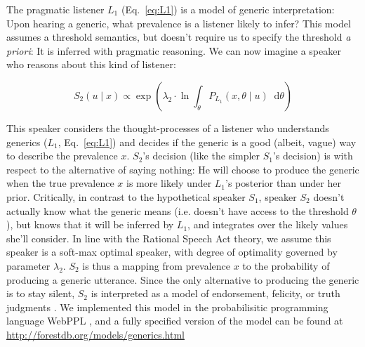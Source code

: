 \documentclass[12pt,letterpaper]{article}
\newcommand*\diff{\mathop{}\!\mathrm{d}}
\begin{document}
The pragmatic listener $L_1$ (Eq.~\ref{eq:L1}) is a model of generic interpretation: Upon hearing a generic, what prevalence is a listener likely to infer?
This model assumes a threshold semantics, but doesn't require us to specify the threshold \emph{a priori}: It is inferred with pragmatic reasoning.
We can now imagine a speaker who reasons about this kind of listener:

\begin{equation} 
S_{2}(u \mid x) \propto  \exp{(\lambda_2 \cdot \ln \int_{\theta} P_{L_{1}}(x , \theta \mid u) \diff \theta ) }%
\label{eq:S2}
\end{equation}

This speaker considers the thought-processes of a listener who understands generics ($L_1$, Eq.~\ref{eq:L1}) and decides if the generic is a good (albeit, vague) way to describe the  prevalence $x$. 
$S_2$'s decision (like the simpler $S_1$'s decision) is with respect to the alternative of saying nothing: He will choose to produce the generic when the true prevalence $x$ is more likely under $L_1$'s posterior than under her prior. 
Critically, in contrast to the hypothetical speaker $S_1$, speaker $S_{2}$ doesn't actually know what the generic means (i.e. doesn't have access to the threshold $\theta$), but knows that it will be inferred by $L_{1}$, and integrates over the likely values she'll consider.
In line with the Rational Speech Act theory, we assume this speaker is a soft-max optimal speaker, with degree of optimality governed by parameter $\lambda_2$.
$S_2$ is thus a mapping from prevalence $x$ to the probability of producing a generic utterance. 
Since the only alternative to producing the generic is to stay silent, $S_2$ is interpreted as a model of endorsement, felicity, or truth judgments \cite{Degen2014}.
We implemented this model in the probabilisitic programming language WebPPL \cite{dippl}, and a fully specified version of the model can be found at \url{http://forestdb.org/models/generics.html}
\end{document}
